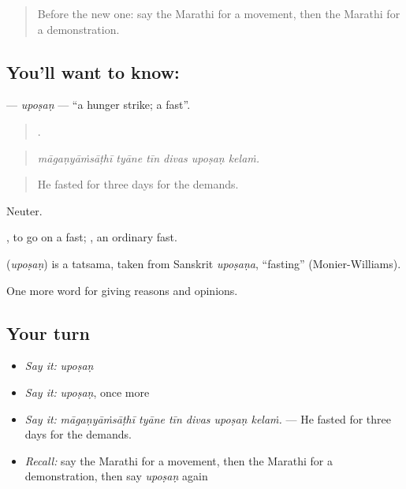 \label{lesson:MR-C362-uposan}



\begin{quote}
Before the new one: say the Marathi for a movement, then the Marathi for a demonstration.
\end{quote}

\subsection*{You'll want to know: }
\textbf{} — \emph{upoṣaṇ} — \textquotedblleft{}a hunger strike; a fast\textquotedblright{}.

\begin{quote}
     .
\end{quote}

\begin{quote}
\emph{māgaṇyāṁsāṭhī tyāne tīn divas upoṣaṇ kelaṁ.}
\end{quote}

\begin{quote}
He fasted for three days for the demands.
\end{quote}

Neuter.

 , to go on a fast; , an ordinary fast.

\begin{cousinweb}
\textbf{} (\emph{upoṣaṇ}) is a tatsama, taken from Sanskrit \emph{upoṣaṇa}, \textquotedblleft{}fasting\textquotedblright{} (Monier-Williams).
\end{cousinweb}

\begin{grammarlens}[title={What you've built}]
One more word for giving reasons and opinions.
\end{grammarlens}

\subsection*{Your turn}
\begin{itemize}
\raggedright
  \item \emph{Say it:} \emph{upoṣaṇ}
  \item \emph{Say it:} \emph{upoṣaṇ}, once more
  \item \emph{Say it:} \emph{māgaṇyāṁsāṭhī tyāne tīn divas upoṣaṇ kelaṁ.} — He fasted for three days for the demands.
  \item \emph{Recall:} say the Marathi for a movement, then the Marathi for a demonstration, then say \emph{upoṣaṇ} again
\end{itemize}


